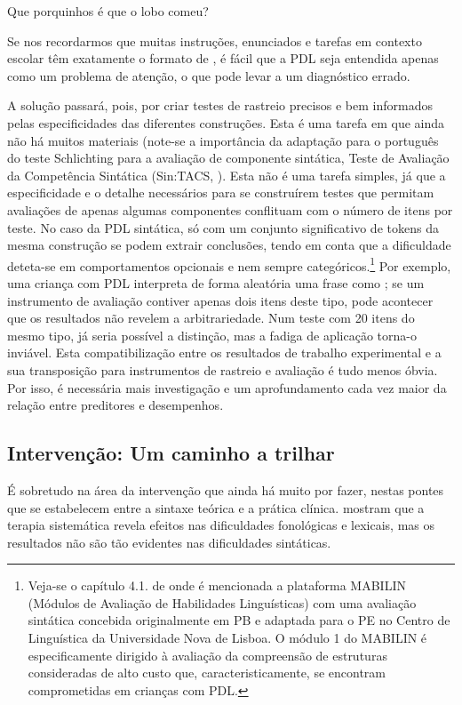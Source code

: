 \documentclass[output=paper,colorlinks,citecolor=brown,booklanguage=portuguese]{langscibook}
\begin{document}
\ea\label{ex:cap2ex35} Que porquinhos é que o lobo comeu?
\z

Se nos recordarmos que muitas instruções, enunciados e tarefas em contexto escolar têm exatamente o formato de , é fácil que a PDL seja entendida apenas como um problema de atenção, o que pode levar a um diagnóstico errado.

A solução passará, pois, por criar testes de rastreio precisos e bem informados pelas especificidades das diferentes construções. Esta é uma tarefa em que ainda não há muitos materiais (note-se a importância da adaptação para o português do teste Schlichting para a avaliação de componente sintática, Teste de Avaliação da Competência Sintática (Sin:TACS, \citealp{Vieira2018}). Esta não é uma tarefa simples, já que a especificidade e o detalhe necessários para se construírem testes que permitam avaliações de apenas algumas componentes conflituam com o número de itens por teste. No caso da PDL sintática, só com um conjunto significativo de tokens da mesma construção se podem extrair conclusões, tendo em conta que a dificuldade deteta-se em comportamentos opcionais e nem sempre categóricos.\footnote{Veja-se o capítulo 4.1. de  onde é mencionada a plataforma MABILIN (Módulos de Avaliação de Habilidades Linguísticas) com uma avaliação sintática concebida originalmente em PB e adaptada  para o PE no Centro de Linguística da Universidade Nova de Lisboa. O módulo 1 do MABILIN é especificamente dirigido à avaliação da compreensão de estruturas consideradas de alto custo que, caracteristicamente, se encontram comprometidas em crianças com PDL.} Por exemplo, uma criança com PDL interpreta de forma aleatória uma frase como ; se um instrumento de avaliação contiver apenas dois itens deste tipo, pode acontecer que os resultados não revelem a arbitrariedade. Num teste com 20 itens do mesmo tipo, já seria possível a distinção, mas a fadiga de aplicação torna-o inviável. Esta compatibilização entre os resultados de trabalho experimental e a sua transposição para instrumentos de rastreio e avaliação é tudo menos óbvia. Por isso, é necessária mais investigação e um aprofundamento cada vez maior da relação entre preditores e desempenhos.


\subsection{Intervenção: Um caminho a trilhar}
É sobretudo na área da intervenção que ainda há muito por fazer, nestas pontes que se estabelecem entre a sintaxe teórica e a prática clínica. \citet{Law2004} mostram que a terapia sistemática revela efeitos nas dificuldades fonológicas e lexicais, mas os resultados não são tão evidentes nas dificuldades sintáticas.
\end{document}
